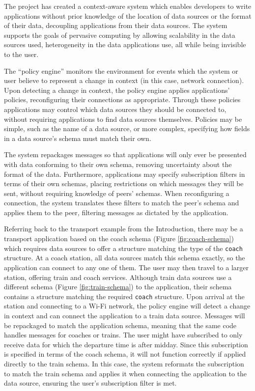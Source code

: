 \documentclass[12pt,twoside,notitlepage]{report}
\begin{document}
The project has created a context-aware system which enables developers to write applications without prior knowledge of the location of data sources or the format of their data, decoupling applications from their data sources. 
The system supports the goals of pervasive computing by allowing scalability in the data sources used, heterogeneity in the data applications use, all while being invisible to the user.

The ``policy engine'' monitors the environment for events which the system or user believe to represent a change in context (in this case, network connection).
Upon detecting a change in context, the policy engine applies applications' policies, reconfiguring their connections as appropriate. 
Through these policies applications may control which data sources they should be connected to, without requiring applications to find data sources themselves.
Policies may be simple, such as the name of a data source, or more complex, specifying how fields in a data source's schema must match their own. 

The system repackages messages so that applications will only ever be presented with data conforming to their own schema, removing uncertainty about the format of the data.
Furthermore, applications may specify subscription filters in terms of their own schemas, placing restrictions on which messages they will be sent, without requiring knowledge of peers' schemas.
When reconfiguring a connection, the system translates these filters to match the peer's schema and applies them to the peer, filtering messages as dictated by the application.

Referring back to the transport example from the Introduction, there may be a transport application based on the coach schema (Figure \ref{fig:coach-schema}) which requires data sources to offer a structure matching the type of the {\tt coach} structure. 
At a coach station, all data sources match this schema exactly, so the application can connect to any one of them. 
The user may then travel to a larger station, offering train and coach services. 
Although train data sources use a different schema (Figure \ref{fig:train-schema}) to the application, their schema contains a structure matching the required {\tt coach} structure.
Upon arrival at the station and connecting to a Wi-Fi network, the policy engine will detect a change in context and can connect the application to a train data source. 
Messages will be repackaged to match the application schema, meaning that the same code handles messages for coaches or trains.
The user might have subscribed to only receive data for which the departure time is after midday. 
Since this subscription is specified in terms of the coach schema, it will not function correctly if applied directly to the train schema. 
In this case, the system reformats the subscription to match the train schema and applies it when connecting the application to the data source, ensuring the user's subscription filter is met.
\end{document}
